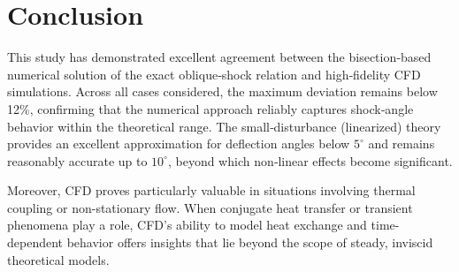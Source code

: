 \newpage
\section{Conclusion}

This study has demonstrated excellent agreement between the bisection‐based numerical solution of the exact oblique‐shock relation and high‐fidelity CFD simulations. Across all cases considered, the maximum deviation remains below 12\%, confirming that the numerical approach reliably captures shock‐angle behavior within the theoretical range. The small‐disturbance (linearized) theory provides an excellent approximation for deflection angles below \(5^\circ\) and remains reasonably accurate up to \(10^\circ\), beyond which non‐linear effects become significant.

Moreover, CFD proves particularly valuable in situations involving thermal coupling or non-stationary flow. When conjugate heat transfer or transient phenomena play a role, CFD’s ability to model heat exchange and time-dependent behavior offers insights that lie beyond the scope of steady, inviscid theoretical models.
